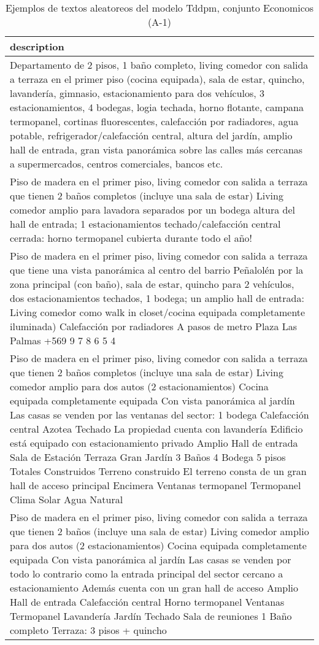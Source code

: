 \begin{table}[H]
\centering
\fontsize{8}{14}\selectfont
\caption{Ejemplos de textos aleatoreos del modelo Tddpm, conjunto Economicos (A-1)}
\label{table-sample10-economicos-a-1-tddpm_mlp-text}
\begin{tabular}{|m{50em}|}
\hline
\rowcolor[gray]{0.8}
description \\
\hline Departamento de 2 pisos, 1 baño completo, living comedor con salida a terraza en el primer piso (cocina equipada), sala de estar, quincho, lavandería, gimnasio, estacionamiento para dos vehículos, 3 estacionamientos, 4 bodegas, logia techada, horno flotante, campana termopanel, cortinas fluorescentes, calefacción por radiadores, agua potable, refrigerador/calefacción central, altura del jardín, amplio hall de entrada, gran vista panorámica sobre las calles más cercanas a supermercados, centros comerciales, bancos etc. \\
\hline Piso de madera en el primer piso, living comedor con salida a terraza que tienen 2 baños completos (incluye una sala de estar) Living comedor amplio para lavadora separados por un bodega altura del hall de entrada; 1 estacionamientos techado/calefacción central cerrada: horno termopanel cubierta durante todo el año! \\
\hline Piso de madera en el primer piso, living comedor con salida a terraza que tiene una vista panorámica al centro del barrio Peñalolén por la zona principal (con baño), sala de estar, quincho para 2 vehículos, dos estacionamientos techados, 1 bodega; un amplio hall de entrada: Living comedor como walk in closet/cocina equipada completamente iluminada) Calefacción por radiadores A pasos de metro Plaza Las Palmas +569 9 7 8 6 5 4 \\
\hline Piso de madera en el primer piso, living comedor con salida a terraza que tienen 2 baños completos (incluye una sala de estar) Living comedor amplio para dos autos (2 estacionamientos) Cocina equipada completamente equipada Con vista panorámica al jardín Las casas se venden por las ventanas del sector: 1 bodega Calefacción central Azotea Techado La propiedad cuenta con lavandería Edificio está equipado con estacionamiento privado Amplio Hall de entrada Sala de Estación Terraza Gran Jardín 3 Baños 4 Bodega 5 pisos Totales Construidos Terreno construido El terreno consta de un gran hall de acceso principal Encimera Ventanas termopanel Termopanel Clima Solar Agua Natural \\
\hline Piso de madera en el primer piso, living comedor con salida a terraza que tienen 2 baños (incluye una sala de estar) Living comedor amplio para dos autos (2 estacionamientos) Cocina equipada completamente equipada Con vista panorámica al jardín Las casas se venden por todo lo contrario como la entrada principal del sector cercano a estacionamiento Además cuenta con un gran hall de acceso Amplio Hall de entrada Calefacción central Horno termopanel Ventanas Termopanel Lavandería Jardín Techado Sala de reuniones 1 Baño completo Terraza: 3 pisos + quincho \\

\end{tabular}
\end{table}
